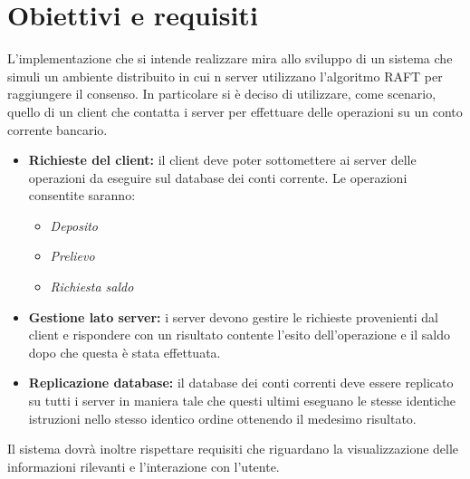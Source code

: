\section{Obiettivi e requisiti}
	L'implementazione che si intende realizzare mira allo sviluppo di un sistema che simuli un ambiente distribuito in cui n server utilizzano l'algoritmo RAFT per raggiungere il consenso. In particolare si è deciso di utilizzare, come scenario, quello di un client che contatta i server per effettuare delle operazioni su un conto corrente bancario.
	\begin{itemize}
			\item \textbf{Richieste del client:} il client deve poter sottomettere ai server delle operazioni da eseguire sul database dei conti corrente. Le operazioni consentite saranno:
				\begin{itemize}
					\item \emph{Deposito}
					\item \emph{Prelievo}
					\item \emph{Richiesta saldo}
				\end{itemize}
			\item \textbf{Gestione lato server:} i server devono gestire le richieste provenienti dal client e rispondere con un risultato contente l'esito dell'operazione e il saldo dopo che questa è stata effettuata.
			\item \textbf{Replicazione database:} il database dei conti correnti deve essere replicato su tutti i server in maniera tale che questi ultimi eseguano le stesse identiche istruzioni nello stesso identico ordine ottenendo il medesimo risultato.
		\end{itemize}

	Il sistema dovrà inoltre rispettare requisiti che riguardano la visualizzazione delle informazioni rilevanti e l'interazione con l'utente.



